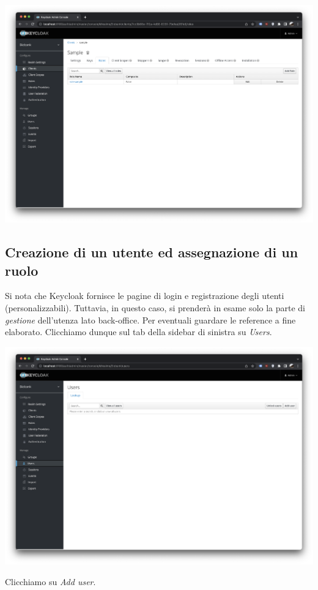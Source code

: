 \documentclass{article}
\begin{document}
\begin{center}
    \includegraphics[width=0.80\linewidth]{keycloak_10.png}
\end{center}

\subsection{Creazione di un utente ed assegnazione di un ruolo}

Si nota che Keycloak fornisce le pagine di login e registrazione degli utenti (personalizzabili).
Tuttavia, in questo caso, si prenderà in esame solo la parte di \textit{gestione} dell'utenza lato back-office. Per eventuali guardare le reference a fine elaborato.
Clicchiamo dunque sul tab della sidebar di sinistra su \textit{Users}.

\begin{center}
    \includegraphics[width=0.80\linewidth]{keycloak_11.png}
\end{center}

Clicchiamo su \textit{Add user}.
\end{document}
